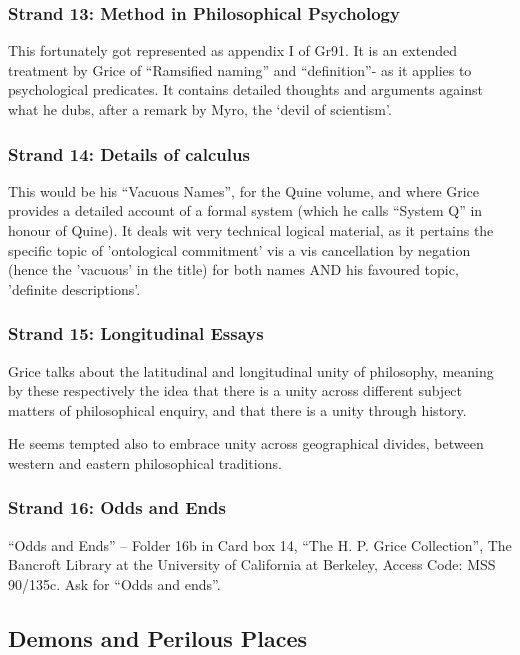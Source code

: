 \documentclass[10pt,titlepage]{book}
\begin{document}
\subsubsection{Strand 13: Method in Philosophical Psychology}

This fortunately got represented as appendix I of Gr91\cite{grice91}.
It is an extended treatment by Grice of ``Ramsified naming'' and ``definition''- as it applies to psychological predicates.
It contains detailed thoughts and arguments against what he dubs, after a remark by Myro, the `devil of scientism'. 
 
\subsubsection{Strand 14: Details of calculus}

This would be his ``Vacuous Names'', for the Quine volume, and where Grice provides a detailed account of a formal system (which he calls ``System Q'' in honour of Quine).
It deals wit very technical logical material, as it pertains the specific topic of 'ontological commitment' vis a vis cancellation by negation (hence the 'vacuous' in the title) for both names AND his favoured topic, 'definite descriptions'.
 
\subsubsection{Strand 15: Longitudinal Essays}

Grice talks about the latitudinal and longitudinal unity of philosophy, meaning by these respectively the idea that there is a unity across different subject matters of philosophical enquiry, and that there is a unity through history.

He seems tempted also to embrace unity across geographical divides, between western and eastern philosophical traditions.

\subsubsection{Strand 16: Odds and Ends}

``Odds and Ends'' -- Folder 16b in Card box 14, ``The H. P. Grice Collection'', The Bancroft Library at the University of California at Berkeley, Access Code: MSS 90/135c.
Ask for ``Odds and ends''.

\subsection{Demons and Perilous Places}\label{Demons}
\end{document}
